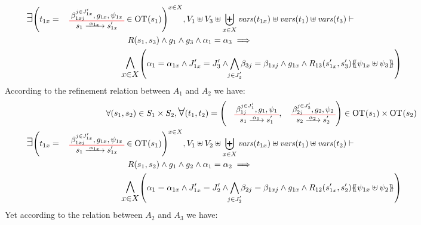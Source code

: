 \documentclass[runningheads]{llncs}
\begin{document}
\begin{enumerate}
\begin{multline*}
\bigsymb{\bigexists} 
\mpar{t_{1x} = \OTx{1}{x}{1x}{1x} \in \fOT{s_1}}^{x \in X},
 V_1 \uplus V_3\uplus \biguplus_{x\in X}\fvars{t_{1x}} \uplus \fvars{t_1} \uplus \fvars{t_3} \vdash \hspace{6cm}\\  R\mpar{s_1, s_3} \wedge 	g_1 \wedge g_3 \wedge \alpha_1 = \alpha_3 
\implies \hspace{6cm}\\
\bigsymb{\bigwedge_{x\in X}}
\mpar{
\alpha_1=\alpha_{1 x}  \land J'_{1x}= J'_3 \land \bigwedge_\subbox{j \in J'_3 } \beta_{3j} = \beta_{1xj}\land g_{1 x}\land
 R_{13}\mpar{s'_{1 x}, s'_3}\psubst{\psi_{1 x} \uplus \psi_3}}
\end{multline*}
According to the refinement relation between  $A_1$ and $A_2$ we have:
\begin{multline*}
\forall \mpar{s_1, s_2} \in S_1 \times S_2, \bigsymb{\forall} \mpar{t_1, t_2} = \mpar{\OTx{1}{}{1}{1}, \OTx{2}{}{2}{2}} \in \fOT{s_1} \times \fOT{s_2} \\ 
\bigsymb{\bigexists} 
\mpar{t_{1x} = \OTx{1}{x}{1x}{1x} \in \fOT{s_1}}^{x \in X},
 V_1 \uplus V_2 \uplus \biguplus_{x\in X}\fvars{t_{1x}} \uplus \fvars{t_1} \uplus \fvars{t_2} \vdash \hspace{6cm}\\  R\mpar{s_1, s_2} \wedge 	g_1 \wedge g_2 \wedge \alpha_1 = \alpha_2 
\implies \hspace{6cm}\\
\bigsymb{\bigwedge_{x\in X}}
\mpar{
\alpha_1=\alpha_{1 x}  \land J'_{1x}= J'_2 \land \bigwedge_\subbox{j \in J'_2 } \beta_{2j} = \beta_{1xj}\land g_{1 x}\land
 R_{12}\mpar{s'_{1 x}, s'_2}\psubst{\psi_{1 x} \uplus \psi_2}}
\end{multline*}
Yet according to the relation between   $A_2$ and $A_3$ we have:


\end{enumerate}
\end{document}
